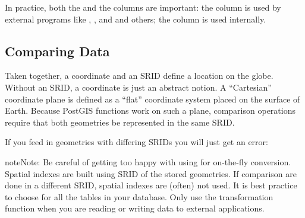 \documentclass[a4paper,11pt,english]{sphinxmanual}
\begin{document}
In practice, both the  and the  columns are important: the  column is used by external programs like , , and   and others; the  column is used internally.


\subsection{Comparing Data}
\label{\detokenize{basic:comparing-data}}
Taken together, a coordinate and an SRID define a location on the globe. Without an SRID, a coordinate is just an abstract notion. A “Cartesian” coordinate plane is defined as a “flat” coordinate system placed on the surface of Earth. Because PostGIS functions work on such a plane, comparison operations require that both geometries be represented in the same SRID.

If you feed in geometries with differing SRIDs you will just get an error:

\begin{sphinxVerbatim}[commandchars=\\\{\}]
 
          
          
\end{sphinxVerbatim}

\begin{sphinxVerbatim}[commandchars=\\\{\}]
      
      
\end{sphinxVerbatim}

\begin{sphinxadmonition}{note}{Note:}
Be careful of getting too happy with using  for on-the-fly conversion. Spatial indexes are built using SRID of the stored geometries.  If comparison are done in a different SRID, spatial indexes are (often) not used. It is best practice to choose  for all the tables in your database. Only use the transformation function when you are reading or writing data to external applications.
\end{sphinxadmonition}
\end{document}
